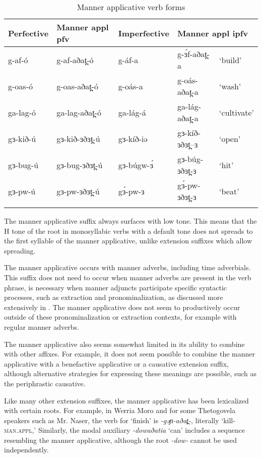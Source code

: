 \begin{table}
\begin{tabular}[t]{lllll} 
\lsptoprule
Perfective	& 	Manner appl pfv 	& Imperfective & \multicolumn{2}{l}{Manner appl ipfv} 	 \\
\midrule
g-af-ó			&	g-af-aðat̪-ó		&	g-áf-a		&	g-ɜ́f-aðat̪-a		& `build'\\%
g-oas-ó			& 	g-oas-aðat̪-ó		& 	g-oás-a		& 	g-oás-aðat̪-a 		& ‘wash’	\\
ga-lag-ó		&	ga-lag-aðat̪-ó		& 	ga-lág-á	&	ga-lág-aðat̪-a 		& ‘cultivate’\\
gɜ-kið-ú		&	gɜ-kið-ɜðɜt̪-ú		&	gɜ-kíð-iə	&	gɜ-kíð-ɜðɜt̪--ɜ		&	‘open’\\
gɜ-bug-ú		&	gɜ-bug-ɜðɜt̪-ú		&	gɜ-búgw-ɜ́	&	gɜ-búg-ɜðɜt̪-ɜ		&	‘hit’\\ %
gɜ-pw-ú		&	gɜ-pw-ɜðɜt̪-ú		&	gɜ́-pw-ɜ	&	gɜ́-pw-ɜðɜt̪-ɜ		&	‘beat’\\ %
\lspbottomrule
\end{tabular}
\caption{Manner applicative verb forms} \label{tab:ch11:manner}    
\end{table}  

The manner applicative suffix always surfaces with low tone. This means that the H tone of the root in monosyllabic verbs with a default tone does not spreads to the first syllable of the manner applicative, unlike extension suffixes which allow spreading.

The manner applicative occurs with manner adverbs, including time adverbials. This suffix does not need to occur when manner adverbs are present in the verb phrase, is necessary when manner adjuncts participate specific syntactic processes, such as extraction and pronominalization, as discussed more extensively in . The manner applicative does not seem to productively occur outside of these pronominalization or extraction contexts, for example with regular manner adverbs.

The manner applicative also seems somewhat limited in its ability to combine with other affixes. For example, it does not seem possible to combine the manner applicative with a benefactive applicative or a causative extension suffix, although alternative strategies for expressing these meanings are possible, such as the periphrastic causative.

Like many other extension suffixes, the manner applicative has been lexicalized with certain roots. For example, in Werria Moro and for some Thetogovela speakers such as Mr. Naser, the verb for `finish' is \textit{-gəɲ-aðat̪-}, literally `kill-\textsc{man.appl},' Similarly, the modal auxiliary \textit{-dowaðatia} `can' includes a sequence resembling the manner applicative, although the root \textit{-dow-} cannot be used independently.



